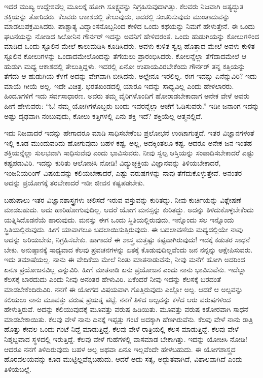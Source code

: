 ಇದರ ಮುಖ್ಯ ಉದ್ದೇಶವೆಲ್ಲ ಮೂಲಕ್ಕೆ ಹೋಗಿ ಸೂಕ್ಷ್ಮವನ್ನು ನಿಗ್ರಹಿಸುವುದಾಗಿತ್ತು. ಕೆಲವರು ನಿಜವಾಗಿ ಅತ್ಯದ್ಭುತ ಶಕ್ತಿಯನ್ನು ತೋರಿದರು. ಕೆಲವರು ಆಕಾಶದಲ್ಲಿ ತೇಲುವುದು, ಅದರಲ್ಲಿ ಸಂಚರಿಸುವುದು ಮುಂತಾದುವನ್ನು ಮಾಡಲುಪಕ್ರಮಿಸಿದರು. ಪಾಶ್ಚಾತ್ಯ ವಿದ್ವಾಂಸನೊಬ್ಬನಿಂದ ಕೇಳಿದ ಒಂದು ಕಥೆಯನ್ನು ನಿಮಗೆ ಹೇಳುತ್ತೇನೆ. ಈ ಒಂದು ಘಟನೆಯನ್ನು ನೋಡಿದ ಸಿಲೋನಿನ ಗೌರ್ನರ್‌ ಇದನ್ನು ಅವನಿಗೆ ಹೇಳಿದರಂತೆ. ಒಂದು ಹುಡುಗಿಯನ್ನು ಕೋಲುಗಳಿಂದ ಮಾಡಿದ ಒಂದು ಸ್ಟೂಲಿನ ಮೇಲೆ ಕಾಲುಮಡಿಸಿ ಕೂಡಿಸಿದರು. ಅವಳು ಕುಳಿತ ಸ್ವಲ್ಪ ಹೊತ್ತಾದ ಮೇಲೆ ಅವಳು ಕುಳಿತ ಸ್ಟೂಲಿನ ಕೋಲುಗಳನ್ನು ಒಂದಾದಮೇಲೊಂದನ್ನು ತೆಗೆಯಲು ಪ್ರಾರಂಭಿಸಿದರು. ಕೋಲನ್ನೆಲ್ಲಾ ತೆಗೆದಾದಮೇಲೆ ಆ ಹುಡುಗಿ ಮಧ್ಯ ಆಕಾಶದಲ್ಲಿ ತೇಲುತ್ತಿದ್ದಳು. ಇದರಲ್ಲಿ ಏನೋ ಉಪಾಯವಿರಬೇಕೆಂದು ಗೌರ್ನರ್‌ ತನ್ನ ಕತ್ತಿಯನ್ನು ತೆಗೆದು ಆ ಹುಡುಗಿಯ ಕೆಳಗೆ ಅದನ್ನು ವೇಗವಾಗಿ ಬೀಸಿದನು. ಅಲ್ಲೇನೂ ಇರಲಿಲ್ಲ. ಈಗ ಇದನ್ನು ಏನೆನ್ನುವಿರಿ? ಇದು ಮಾಯೆ ಗೀಯೆ ಅಲ್ಲ. ಇದೇ ವಿಚಿತ್ರ. ಭರತಖಂಡದಲ್ಲಿ ಯಾರೂ ಇದನ್ನು ಸಾಧ್ಯವಿಲ್ಲ ಎಂದು ಹೇಳಲಾರರು. ಹಿಂದೂಗಳಿಗೆ ಇದು ಸರ್ವಸಾಧಾರಣ. ಅವರು ತಮ್ಮ ವೈರಿಗಳೊಂದಿಗೆ ಹೋರಾಡಬೇಕಾದಾಗ ಅನೇಕ ವೇಳೆ ಅವರು ಹೀಗೆ ಹೇಳುವರು: “ಓ! ನಮ್ಮ ಯೋಗಿಗಳೊಬ್ಬರು ಬಂದು ಇವರನ್ನೆಲ್ಲಾ ಆಚೆಗೆ ಓಡಿಸುವರು.” ಇಡೀ ಜನಾಂಗ ಇದನ್ನು ಅಷ್ಟು ದೃಢವಾಗಿ ನಂಬುವುದು, ಕೋಲು ಕತ್ತಿಗಳಲ್ಲಿ ಏನು ಶಕ್ತಿ ಇದೆ? ಶಕ್ತಿಯೆಲ್ಲ ಆತ್ಮನಲ್ಲಿದೆ.

ಇದು ನಿಜವಾದರೆ ಇದನ್ನು ಹೇಗಾದರೂ ಮಾಡಿ ಸಾಧಿಸಬೇಕೆಂಬ ಪ್ರಲೋಭನೆ ಉಂಟಾಗುತ್ತದೆ. ಇತರ ವಿಜ್ಞಾನಗಳಂತೆ ಇಲ್ಲಿ ಕೂಡ ಮುಂದುವರಿದು ಹೋಗುವುದು ಬಹಳ ಕಷ್ಟ, ಅಲ್ಲ, ಅದಕ್ಕಿಂತಲೂ ಕಷ್ಟ. ಆದರೂ ಅನೇಕ ಜನ ಇಂತಹ ಶಕ್ತಿಯನ್ನೆಲ್ಲಾ ಸುಲಭವಾಗಿ ಸಾಧಿಸುವೆವು ಎಂದು ಭಾವಿಸುವರು. ನೀವು ಸ್ವಲ್ಪ ಆಸ್ತಿಯನ್ನು ಸಂಪಾದಿಸಬೇಕಾದರೆ ಎಷ್ಟು ಕಷ್ಟಪಡುವಿರಿ. ಇದನ್ನು ಕುರಿತು ಆಲೋಚಿಸಿ ನೋಡಿ! ವಿದ್ಯುಚ್ಛಕ್ತಿಯ ವಿಜ್ಞಾನವನ್ನು ತಿಳಿಯಬೇಕಾದರೆ, ಇಂಜನಿಯರಿಂಗ್ ವಿಷಯವನ್ನು ಕಲಿಯಬೇಕಾದರೆ, ಎಷ್ಟು ವರುಷಗಳನ್ನು ನಾವು ತೆಗೆದುಕೊಳ್ಳುತ್ತೇವೆ. ಅನಂತರ ಅದನ್ನು ಪ್ರಯೋಗಕ್ಕೆ ತರಬೇಕಾದರೆ ಇಡೀ ಜೀವನ ಕಷ್ಟಪಡಬೇಕು.

ಬಹುಪಾಲು ಇತರ ವಿಜ್ಞಾನಶಾಸ್ತ್ರಗಳು ಚಲಿಸದೆ ಇರುವ ವಸ್ತುವನ್ನು ಕುರಿತದ್ದು. ನೀವು ಕುರ್ಚಿಯನ್ನು ವಿಶ್ಲೇಷಣೆ ಮಾಡಬಹುದು. ಅದು ಹಾರಿಹೋಗುವುದಿಲ್ಲ. ಆದರೆ ಯೋಗ ಮನಸ್ಸನ್ನು ಕುರಿತದ್ದು. ಅದನ್ನು ತಿಳಿದುಕೊಳ್ಳಬೇಕೆಂದು ಯತ್ನಿಸಿದೊಡನೆಯೆ ಹಾರುವುದು. ಮನಸ್ಸು ಈಗ ಒಂದು ಸ್ಥಿತಿಯಲ್ಲಿರುವುದು, ಇನ್ನೊಂದು ಸಲ ಇನ್ನೊಂದು ಸ್ಥಿತಿಯಲ್ಲಿರುವುದು. ಹೀಗೆ ಯಾವಾಗಲೂ ಬದಲಾಯಿಸುತ್ತಿರುವುದು. ಈ ಬದಲಾವಣೆಯ ಮಧ್ಯದಲ್ಲಿಯೇ ನಾವು ಅದನ್ನು ಅರಿಯಬೇಕು, ನಿಗ್ರಹಿಸಬೇಕು. ಹಾಗಾದರೆ ಈ ಶಾಸ್ತ್ರ ಮತ್ತಷ್ಟು ಕಷ್ಟವಾಗಿರುವುದು! ಇದಕ್ಕೆ ಕಡುತರ ಸಾಧನೆ ಬೇಕು. ಅನುಷ್ಠಾನಕ್ಕೆ ಸಾಧ್ಯವಾದ ಕೆಲವು ಪ್ರವಚನಗಳನ್ನು ಏತಕ್ಕೆ ಕೊಡುವುದಿಲ್ಲವೆಂದು ಜನ ನನ್ನನ್ನು ಆಕ್ಷೇಪಿಸುವರು. ಇದು ತಮಾಷೆಯಲ್ಲ. ನಾನು ಈ ವೇದಿಕೆಯ ಮೇಲೆ ನಿಂತು ಮಾತನಾಡುವೆನು, ನೀವು ಮನೆಗೆ ಹೋಗಿ ಅದರಿಂದ ಏನೂ ಪ್ರಯೋಜನವಿಲ್ಲ ಎನ್ನುವಿರಿ. ಹೀಗೆ ಮಾತನಾಡಿ ಏನು ಪ್ರಯೋಜನ ಎಂದು ನಾನು ಭಾವಿಸುವೆನು. ಇದೆಲ್ಲಾ ಕೆಲಸಕ್ಕೆ ಬಾರದುದು ಎಂದು ನೀವು ಅನಂತರ ಹೇಳುವಿರಿ. ಏಕೆಂದರೆ ನೀವು ಇದನ್ನು ಕೆಲಸಕ್ಕೆ ಬರದಂತೆ ಮಾಡಬೇಕೆಂದಿರುವಿರಿ. ನನಗೆ ಈ ಯೋಗದ ವಿಷಯವಾಗಿ ಗೊತ್ತಿರುವುದು ಎಲ್ಲೋ ಅಲ್ಪ. ಆದರೆ ಆ ಅಲ್ಪವನ್ನು ಕಲಿಯಲು ನಾನು ಮೂವತ್ತು ವರುಷ ಪ್ರಯತ್ನ ಪಟ್ಟೆ. ನನಗೆ ತಿಳಿದ ಅಲ್ಪವನ್ನು ಕಳೆದ ಆರು ವರುಷಗಳಿಂದ ಹೇಳುತ್ತಿರುವೆ. ಅದನ್ನು ಕಲಿಯುವುದಕ್ಕೆ ಮೂವತ್ತು ವರುಷ ಹಿಡಿಯಿತು. ಮೂವತ್ತು ವರುಷ ಕಠೋರವಾಗಿ ಸಾಧನೆ ಮಾಡಬೇಕಾಯಿತು. ಕೆಲವು ವೇಳೆ ನಾನು ದಿನಕ್ಕೆ ಇಪ್ಪತ್ತು ಗಂಟೆ ಅದಕ್ಕಾಗಿ ಹೆಣಗಿರುವೆನು. ಕೆಲವು ವೇಳೆ ನಾನು ರಾತ್ರಿ ಹೊತ್ತು ಕೇವಲ ಒಂದು ಗಂಟೆ ನಿದ್ದೆ ಮಾಡುತ್ತಿದ್ದೆ. ಕೆಲವು ವೇಳೆ ರಾತ್ರಿಯಲ್ಲಿ ಕೆಲಸ ಮಾಡುತ್ತಿದ್ದೆ. ಕೆಲವು ವೇಳೆ ನಿಶ್ಶಬ್ದವಾದ ಸ್ಥಳದಲ್ಲಿ ಇರುತ್ತಿದ್ದೆ. ಕೆಲವು ವೇಳೆ ಗುಹೆಗಳಲ್ಲಿ ವಾಸಮಾಡ ಬೇಕಾಗಿತ್ತು. ಇದನ್ನು ಯೋಚಿಸಿ ನೋಡಿ! ಆದರೂ ನನಗೆ ತಿಳಿದಿರುವುದು ಬಹಳ ಅಲ್ಪ ಅಥವಾ ಏನೂ ಇಲ್ಲವೆಂದೇ ಹೇಳಬಹುದು. ಈ ಯೋಗಶಾಸ್ತ್ರದ ಹೊರವಲಯವನ್ನು ಕೂಡ ಮುಟ್ಟಿಲ್ಲವೆನ್ನಬಹುದು. ಆದರೆ ಅದು ಸತ್ಯ, ಅದ್ಭುತವಾಗಿದೆ, ವಿಶಾಲವಾಗಿದೆ ಎಂದು ತಿಳಿಯಬಲ್ಲೆ.

